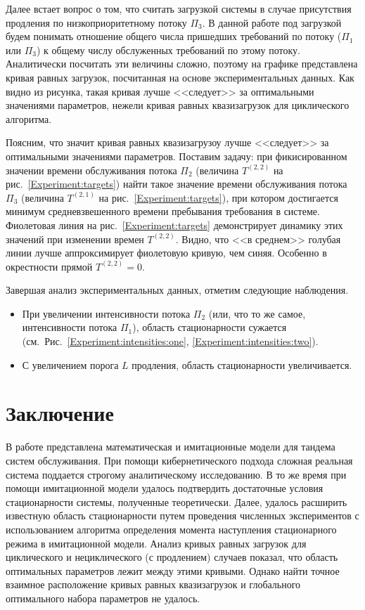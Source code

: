 \documentclass[11pt]{ubs}
\begin{document}
Далее встает вопрос о том, что считать загрузкой системы в случае присутствия продления по низкоприоритетному потоку $\Pi_3$. В данной работе под загрузкой будем понимать отношение общего числа пришедших требований по потоку ($\Pi_1$ или $\Pi_3$) к общему числу обслуженных требований по этому потоку. Аналитически посчитать эти величины сложно, поэтому на графике представлена кривая равных загрузок, посчитанная на основе экспериментальных данных. Как видно из рисунка, такая кривая лучше <<следует>> за оптимальными значениями параметров, нежели кривая равных квазизагрузок для циклического алгоритма.

Поясним, что значит кривая равных квазизагрузоу лучше <<следует>> за оптимальными значениями параметров. Поставим задачу: при фикисированном значении времени обслуживания потока $\Pi_2$ (величина $T^{(2,2)}$ на рис.~\ref{Experiment:targets}) найти такое значение времени обслуживания потока $\Pi_3$ (величина $T^{(2,1)}$ на рис.~\ref{Experiment:targets}), при котором достигается минимум средневзвешенного времени пребывания требования в системе. Фиолетовая линия на рис.~\ref{Experiment:targets} демонстрирует динамику этих значений при изменении времен $T^{(2,2)}$. Видно, что <<в среднем>> голубая линии лучше аппроксимирует фиолетовую кривую, чем синяя. Особенно в окрестности прямой $T^{(2,2)}=0$. 

Завершая анализ экспериментальных данных, отметим следующие наблюдения.
\begin{itemize}
    \item При увеличении интенсивности потока $\Pi_2$ (или, что то же самое, интенсивности потока $\Pi_1$), область  стационарности сужается (см.~Рис.~\ref{Experiment:intensities:one}, \ref{Experiment:intensities:two}).
    \item С увеличением порога $L$ продления, область стационарности увеличивается.
\end{itemize}

\section{Заключение}
В работе представлена математическая и имитационные модели для тандема систем обслуживания. При помощи кибернетического подхода сложная реальная система поддается строгому аналитическому исследованию. В то же время при помощи имитационной модели удалось подтвердить достаточные условия стационарности системы, полученные теоретически. Далее, удалось расширить известную область стационарности путем проведения численных экспериментов с использованием алгоритма определения момента наступления стационарного режима в имитационной модели. Анализ кривых равных загрузок для циклического и нециклического (с продлением) случаев показал, что область оптимальных параметров лежит между этими кривыми. Однако найти точное взаимное расположение кривых равных квазизагрузок и глобального оптимального набора параметров не удалось.
\end{document}

